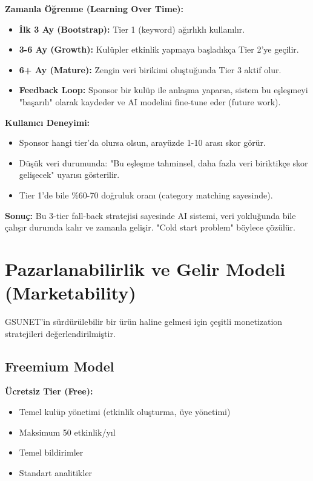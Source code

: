 \documentclass[a4paper,12pt]{report}
\begin{document}
\textbf{Zamanla Öğrenme (Learning Over Time):}

\begin{itemize}
    \item \textbf{İlk 3 Ay (Bootstrap):} Tier 1 (keyword) ağırlıklı kullanılır.
    \item \textbf{3-6 Ay (Growth):} Kulüpler etkinlik yapmaya başladıkça Tier 2'ye geçilir.
    \item \textbf{6+ Ay (Mature):} Zengin veri birikimi oluştuğunda Tier 3 aktif olur.
    \item \textbf{Feedback Loop:} Sponsor bir kulüp ile anlaşma yaparsa, sistem bu eşleşmeyi "başarılı" olarak kaydeder ve AI modelini fine-tune eder (future work).
\end{itemize}

\textbf{Kullanıcı Deneyimi:}

\begin{itemize}
    \item Sponsor hangi tier'da olursa olsun, arayüzde 1-10 arası skor görür.
    \item Düşük veri durumunda: "Bu eşleşme tahminsel, daha fazla veri biriktikçe skor gelişecek" uyarısı gösterilir.
    \item Tier 1'de bile \%60-70 doğruluk oranı (category matching sayesinde).
\end{itemize}

\textbf{Sonuç:} Bu 3-tier fall-back stratejisi sayesinde AI sistemi, veri yokluğunda bile çalışır durumda kalır ve zamanla gelişir. "Cold start problem" böylece çözülür.

\section{Pazarlanabilirlik ve Gelir Modeli (Marketability)}

GSUNET'in sürdürülebilir bir ürün haline gelmesi için çeşitli monetization stratejileri değerlendirilmiştir.

\subsection{Freemium Model}

\textbf{Ücretsiz Tier (Free):}
\begin{itemize}
    \item Temel kulüp yönetimi (etkinlik oluşturma, üye yönetimi)
    \item Maksimum 50 etkinlik/yıl
    \item Temel bildirimler
    \item Standart analitikler
\end{itemize}
\end{document}
